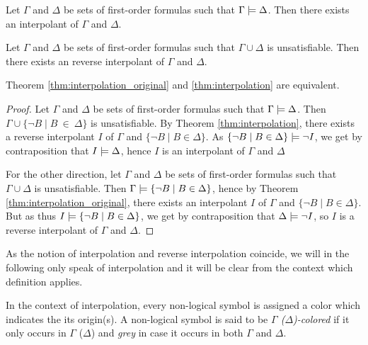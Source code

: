 \begin{thm}[Interpolation]
	\label{thm:interpolation_original}
	Let $\Gamma$ and $\Delta$ be sets of first-order formulas such that $ \Gamma \models \Delta $.
	Then there exists an interpolant of $\Gamma$ and $\Delta$.
\end{thm}

\begin{thm}
	\label{thm:interpolation}
	Let $\Gamma$ and $\Delta$ be sets of first-order formulas such that $ \Gamma \cup \Delta $ is unsatisfiable.
	Then there exists an reverse interpolant of $\Gamma$ and $\Delta$.
\end{thm}


\begin{prop}
	Theorem \ref{thm:interpolation_original} and \ref{thm:interpolation} are equivalent.
	\label{prop:interpolations_equivalent}
\end{prop}
\begin{proof}
	Let $\Gamma$ and $\Delta$ be sets of first-order formulas such that $ \Gamma \models \Delta$.
	Then $\Gamma \cup \{\lnot B \mid B~\in~\Delta\}$ is unsatisfiable.
	By Theorem \ref{thm:interpolation}, there exists a reverse interpolant $I$ of $\Gamma$ and $\{\lnot B \mid B \in \Delta\}$.
	As $\{\lnot B \mid B \in \Delta\} \models \lnot I$, we get by contraposition that $I \models \Delta$, hence $I$ is an interpolant of $\Gamma$ and $\Delta$

	For the other direction,
	let $\Gamma$ and $\Delta$ be sets of first-order formulas such that $ \Gamma \cup \Delta$ is unsatisfiable.
	Then $\Gamma \models \{\lnot B \mid B \in \Delta\}$, hence by Theorem \ref{thm:interpolation_original}, there exists an interpolant $I$ of $\Gamma$ and $\{\lnot B \mid B \in \Delta\}$.
	But as thus $ I\models \{\lnot B \mid B \in \Delta\}$, we get by contraposition that $\Delta \models \lnot I$, so $I$ is a reverse interpolant of $\Gamma$ and $\Delta$.
\end{proof}

As the notion of interpolation and reverse interpolation coincide, we will in the following only speak of interpolation and it will be clear from the context which definition applies.

In the context of interpolation, every non-logical symbol is assigned a color which indicates the its origin(s). 
A non-logical symbol is said to be \emph{$\Gamma$ ($\Delta$)-colored} if it only occurs in $\Gamma$ ($\Delta$) and \emph{grey} in case it occurs in both $\Gamma$ and $\Delta$.
